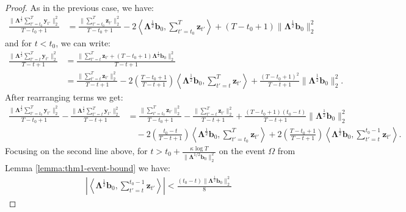 \begin{proof}
As in the previous case, we have:
\begin{align*}
    \frac{\lVert\boldsymbol{\Lambda}^{\frac{1}{2}} \sum_{t'=t_0}^T\mathbf{y}_{t'}\rVert_2^2}{T-t_0+1} &= \frac{\lVert\sum_{t'=t_0}^T\mathbf{z}_{t'}\rVert_2^2}{T-t_0+1} - 2\left\langle \boldsymbol{\Lambda}^{\frac{1}{2}}\mathbf{b}_0, \sum_{t'=t_0}^T\mathbf{z}_{t'}\right\rangle + (T-t_0+1)\lVert\boldsymbol{\Lambda}^{\frac{1}{2}}\mathbf{b}_0\rVert_2^2
\end{align*}
and for $t < t_0$, we can write:
\begin{align*}
    \frac{\lVert\boldsymbol{\Lambda}^{\frac{1}{2}} \sum_{t'=t}^T\mathbf{y}_{t'}\rVert_2^2}{T-t+1} &= \frac{\lVert \sum_{t'=t}^T\mathbf{z}_{t'} + (T-t_0+1)\boldsymbol{\Lambda}^{\frac{1}{2}}\mathbf{b}_0\rVert_2^2}{T-t+1} \\
    &= \frac{\lVert \sum_{t'=t}^T\mathbf{z}_{t'}\rVert_2^2}{T-t+1} -2\left(\frac{T-t_0+1}{T-t+1}\right) \left\langle \boldsymbol{\Lambda}^{\frac{1}{2}}\mathbf{b}_0, \sum_{t'=t}^T\mathbf{z}_{t'}\right\rangle  + \frac{(T-t_0+1)^2}{T-t+1}\lVert\boldsymbol{\Lambda}^{\frac{1}{2}}\mathbf{b}_0\rVert_2^2.
\end{align*}
After rearranging terms we get:
\begin{align*}
    \frac{\lVert\boldsymbol{\Lambda}^{\frac{1}{2}} \sum_{t'=t_0}^T\mathbf{y}_{t'}\rVert_2^2}{T-t_0+1} - \frac{\lVert\boldsymbol{\Lambda}^{\frac{1}{2}} \sum_{t'=t}^T\mathbf{y}_{t'}\rVert_2^2}{T-t+1} &=\frac{\lVert \sum_{t'=t_0}^T\mathbf{z}_{t'}\rVert_2^2}{T-t_0+1} - \frac{\lVert\sum_{t'=t}^T\mathbf{z}_{t'}\rVert_2^2}{T-t+1} + \frac{(T-t_0+1)(t_0 - t) }{T-t+1}\lVert\boldsymbol{\Lambda}^{\frac{1}{2}} \mathbf{b}_0\rVert^2_2 \\
    &\quad - 2\left(\frac{t_0 - t}{T-t+1}\right)\left\langle \boldsymbol{\Lambda}^{\frac{1}{2}}\mathbf{b}_0, \sum_{t'=t_0}^T\mathbf{z}_{t'}\right\rangle + 2\left(\frac{T-t_0+1}{T-t+1}\right)\left\langle \boldsymbol{\Lambda}^{\frac{1}{2}}\mathbf{b}_0, \sum_{t'=t}^{t_0-1}\mathbf{z}_{t'}\right\rangle.
\end{align*}
Focusing on the second line above, for $t > t_0 + \frac{\kappa \log T}{\lVert\boldsymbol{\Lambda}^{1/2}\mathbf{b}_0\rVert^2_2}$ on the event $\Omega$ from Lemma \ref{lemma:thm1-event-bound} we have:
\begin{align*}
    \left|\left\langle\boldsymbol{\Lambda}^{\frac{1}{2}}\mathbf{b}_0, \sum_{t'=t}^{t_0-1}\mathbf{z}_{t'} \right\rangle\right| < \frac{(t_0-t) \lVert\boldsymbol{\Lambda}^{\frac{1}{2}} \mathbf{b}_0\rVert_2^2}{8}
\end{align*}

\end{proof}
